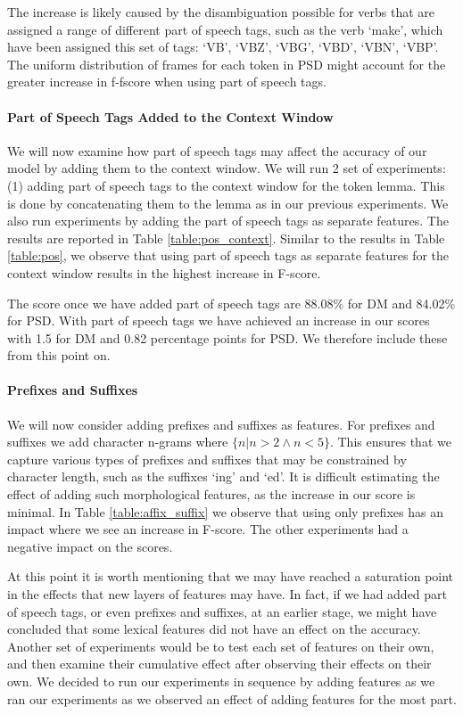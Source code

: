 The increase is likely caused by the disambiguation possible for verbs that are assigned a range of different part of speech tags, such as the verb `make', which have been assigned this set of tags: `VB', `VBZ', `VBG', `VBD', `VBN', `VBP'. The uniform distribution of frames for each token in PSD might account for the greater increase in f-fscore when using part of speech tags.

\paragraph{Part of Speech Tags Added to the Context Window} We will now examine how part of speech tags may affect the accuracy of our model by adding them to the context window. We will run 2 set of experiments: (1) adding part of speech tags to the context window for the token lemma. This is done by concatenating them to the lemma as in our previous experiments. We also run experiments by adding the part of speech tags as separate features. The results are reported in Table \ref{table:pos_context}. Similar to the results in Table \ref{table:pos}, we observe that using part of speech tags as separate features for the context window results in the highest increase in F-score. 

The score once we have added part of speech tags are 88.08\% for DM and 84.02\% for PSD. With part of speech tags we have achieved an increase in our scores with 1.5 for DM and 0.82 percentage points for PSD. We therefore include these from this point on.

\paragraph{Prefixes and Suffixes} We will now consider adding prefixes and suffixes as features. For prefixes and suffixes we add character n-grams where ${\{n|n>2 \wedge n<5\}}$. This ensures that we capture various types of prefixes and suffixes that may be constrained by character length, such as the suffixes `ing' and `ed'. It is difficult estimating the effect of adding such morphological features, as the increase in our score is minimal. In Table \ref{table:affix_suffix} we observe that using only prefixes has an impact where we see an increase in F-score. The other experiments had a negative impact on the scores.

At this point it is worth mentioning that we may have reached a saturation point in the effects that new layers of features may have. In fact, if we had added part of speech tags, or even prefixes and suffixes, at an earlier stage, we might have concluded that some lexical features did not have an effect on the accuracy. Another set of experiments would be to test each set of features on their own, and then examine their cumulative effect after observing their effects on their own. We decided to run our experiments in sequence by adding features as we ran our experiments as we observed an effect of adding features for the most part.




